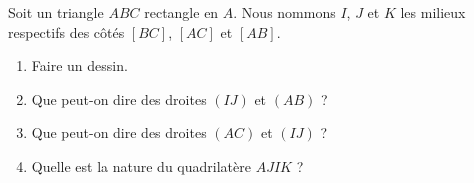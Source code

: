 
\begin{exercice}\label{exosmath-0993}

    Soit un triangle \( ABC\) rectangle en \( A\). Nous nommons \( I\), \( J\) et \( K\) les milieux respectifs des côtés \( [BC]\), \( [AC]\) et \( [AB]\).
    \begin{enumerate}
        \item
            Faire un dessin.
        \item
            Que peut-on dire des droites \( (IJ)\) et \( (AB)\) ?
        \item
            Que peut-on dire des droites \( (AC)\) et \( (IJ)\) ?
        \item
            Quelle est la nature du quadrilatère \( AJIK\) ?
    \end{enumerate}

\end{exercice}
